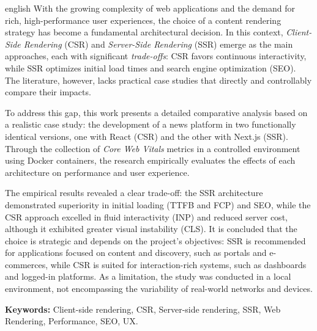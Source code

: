 \begin{resumo}[Abstract]
\begin{otherlanguage*}{english}
With the growing complexity of web applications and the demand for rich, high-performance user experiences, the choice of a content rendering strategy has become a fundamental architectural decision. In this context, \textit{Client-Side Rendering} (CSR) and \textit{Server-Side Rendering} (SSR) emerge as the main approaches, each with significant \textit{trade-offs}: CSR favors continuous interactivity, while SSR optimizes initial load times and search engine optimization (SEO). The literature, however, lacks practical case studies that directly and controllably compare their impacts.

To address this gap, this work presents a detailed comparative analysis based on a realistic case study: the development of a news platform in two functionally identical versions, one with React (CSR) and the other with Next.js (SSR). Through the collection of \textit{Core Web Vitals} metrics in a controlled environment using Docker containers, the research empirically evaluates the effects of each architecture on performance and user experience.

The empirical results revealed a clear trade-off: the SSR architecture demonstrated superiority in initial loading (TTFB and FCP) and SEO, while the CSR approach excelled in fluid interactivity (INP) and reduced server cost, although it exhibited greater visual instability (CLS). It is concluded that the choice is strategic and depends on the project's objectives: SSR is recommended for applications focused on content and discovery, such as portals and e-commerces, while CSR is suited for interaction-rich systems, such as dashboards and logged-in platforms. As a limitation, the study was conducted in a local environment, not encompassing the variability of real-world networks and devices.

\textbf{Keywords:} Client-side rendering, CSR, Server-side rendering, SSR, Web Rendering, Performance, SEO, UX.
\end{otherlanguage*}
\end{resumo}